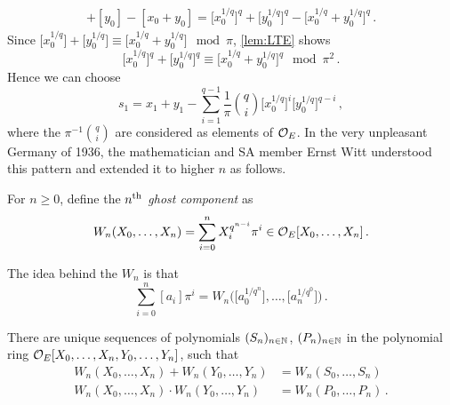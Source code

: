 \documentclass[a4paper, 10pt, oneside, DIV=9, chapterprefix=true, numbers=enddot,bibliography=totoc]{scrbook}
\begin{document}
\begin{align*}
	[x_0]+[y_0]-[x_0+y_0]=\big[x_0^{1/q}\big]^q+\big[y_0^{1/q}\big]^q-\big[x_0^{1/q}+y_0^{1/q}\big]^q\,.
\end{align*}
Since $\big[x_0^{1/q}\big]+\big[y_0^{1/q}\big]\equiv\big[x_0^{1/q}+y_0^{1/q}\big]\mod \pi$, \cref{lem:LTE} shows
\begin{equation*}
	\big[x_0^{1/q}\big]^q+\big[y_0^{1/q}\big]^q\equiv\big[x_0^{1/q}+y_0^{1/q}\big]^q\mod \pi^2\,.
\end{equation*}
Hence we can choose
\begin{equation*}
	s_1=x_1+y_1-\sum_{i=1}^{q-1}\frac{1}{\pi}\binom{q}{i}\big[x_0^{1/q}\big]^i\big[y_0^{1/q}\big]^{q-i}\,,
\end{equation*}
where the $\pi^{-1}\binom{q}{i}$ are considered as elements of $\mathcal{O}_E$. In the very unpleasant Germany of 1936, the mathematician and SA member Ernst Witt understood this pattern and extended it to higher $n$ as follows.
\begin{defi}
	For $n\geq 0$, define the \emph{$n^{\text{th}}$ ghost component} as
	\begin{equation*}
		W_n(X_0,\dotsc,X_n)=\sum_{i=0}^{n}X_i^{q^{n-i}}\pi^i\in\mathcal{O}_E[X_0,\dotsc,X_n]\,.
	\end{equation*}
\end{defi}
\begin{urem}
The idea behind the $W_n$ is that 
\begin{equation*}
	\sum_{i=0}^n[a_i]\pi^i=W_n\Big(\big[a_0^{1/q^n}\big],\dotsc,\big[a_n^{1/q^0}\big]\Big)\,.
\end{equation*}
\end{urem}
\begin{prop}\label{prop:WittPolynomials}
	There are unique sequences of polynomials $(S_n)_{n\in \mathbb{N}}$, $(P_n)_{n\in\mathbb{N}}$ in the polynomial ring $\mathcal{O}_E[X_0,\ldots,X_n,Y_0,\ldots,Y_n]$, such that
	\begin{align*}
		W_n(X_0,\dotsc,X_n)+W_n(Y_0,\dotsc,Y_n)&=W_n(S_0,\dotsc,S_n)\\
		W_n(X_0,\dotsc,X_n)\cdot W_n(Y_0,\dotsc,Y_n)&=W_n(P_0,\dotsc,P_n)\,.
	\end{align*}
\end{prop}
\end{document}
